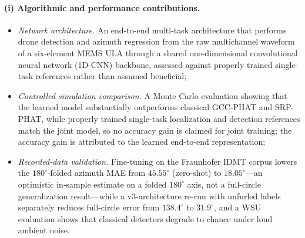 \documentclass[5p,twocolumn]{elsarticle}
\begin{document}
\paragraph{(i) Algorithmic and performance contributions.}
\begin{itemize}
    \item \emph{Network architecture.} An end-to-end multi-task architecture that performs drone detection and azimuth regression from the raw multichannel waveform of a six-element MEMS ULA through a shared one-dimensional convolutional neural network (1D-CNN) backbone, assessed against properly trained single-task references rather than assumed beneficial;
    \item \emph{Controlled simulation comparison.} A Monte Carlo evaluation showing that the learned model substantially outperforms classical GCC-PHAT and SRP-PHAT, while properly trained single-task localization and detection references match the joint model, so no accuracy gain is claimed for joint training; the accuracy gain is attributed to the learned end-to-end representation;
    \item \emph{Recorded-data validation.} Fine-tuning on the Fraunhofer IDMT corpus lowers the $180^\circ$-folded azimuth MAE from $45.55^\circ$ (zero-shot) to $18.05^\circ$---an optimistic in-sample estimate on a folded $180^\circ$ axis, not a full-circle generalization result---while a v3-architecture re-run with unfurled labels separately reduces full-circle error from $138.4^\circ$ to $31.9^\circ$, and a WSU evaluation shows that classical detectors degrade to chance under loud ambient noise.
\end{itemize}
\end{document}
